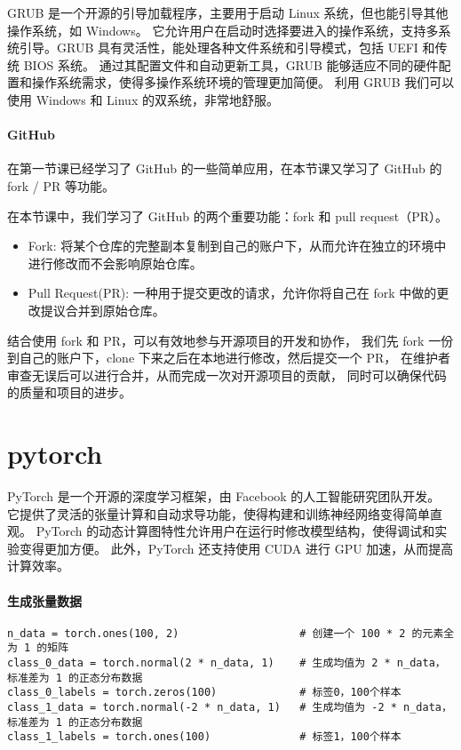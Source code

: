 \documentclass[16pt]{lzc}
\begin{document}
            GRUB 是一个开源的引导加载程序，主要用于启动 Linux 系统，但也能引导其他操作系统，如 Windows。
            它允许用户在启动时选择要进入的操作系统，支持多系统引导。GRUB 具有灵活性，能处理各种文件系统和引导模式，包括 UEFI 和传统 BIOS 系统。
            通过其配置文件和自动更新工具，GRUB 能够适应不同的硬件配置和操作系统需求，使得多操作系统环境的管理更加简便。
            利用 GRUB 我们可以使用 Windows 和 Linux 的双系统，非常地舒服。

        \paragraph{GitHub}
            在第一节课已经学习了 GitHub 的一些简单应用，在本节课又学习了 GitHub 的 fork / PR 等功能。

            在本节课中，我们学习了 GitHub 的两个重要功能：fork 和 pull request（PR）。

            \begin{itemize}
                \item Fork: 将某个仓库的完整副本复制到自己的账户下，从而允许在独立的环境中进行修改而不会影响原始仓库。
                \item Pull Request(PR): 一种用于提交更改的请求，允许你将自己在 fork 中做的更改提议合并到原始仓库。
            \end{itemize}

            结合使用 fork 和 PR，可以有效地参与开源项目的开发和协作，
            我们先 fork 一份到自己的账户下，clone 下来之后在本地进行修改，然后提交一个 PR，
            在维护者审查无误后可以进行合并，从而完成一次对开源项目的贡献，
            同时可以确保代码的质量和项目的进步。


    \section{pytorch}\label{sec:pytorch}

    PyTorch 是一个开源的深度学习框架，由 Facebook 的人工智能研究团队开发。
    它提供了灵活的张量计算和自动求导功能，使得构建和训练神经网络变得简单直观。
    PyTorch 的动态计算图特性允许用户在运行时修改模型结构，使得调试和实验变得更加方便。
    此外，PyTorch 还支持使用 CUDA 进行 GPU 加速，从而提高计算效率。

    \paragraph{生成张量数据}
        \begin{verbatim}
n_data = torch.ones(100, 2)                   # 创建一个 100 * 2 的元素全为 1 的矩阵
class_0_data = torch.normal(2 * n_data, 1)    # 生成均值为 2 * n_data，标准差为 1 的正态分布数据
class_0_labels = torch.zeros(100)             # 标签0，100个样本
class_1_data = torch.normal(-2 * n_data, 1)   # 生成均值为 -2 * n_data，标准差为 1 的正态分布数据
class_1_labels = torch.ones(100)              # 标签1，100个样本
        \end{verbatim}
\end{document}
